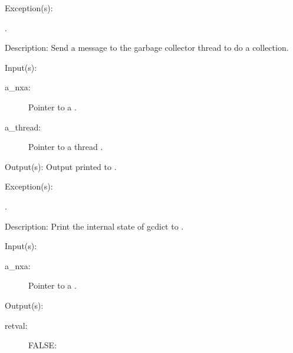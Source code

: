 \begin{capi}
\begin{capilist}
	\item[Exception(s): ]
		\begin{description}\item[]
		\item[.]
		\end{description}
	\item[Description: ]
		Send a message to the garbage collector thread to do a
		collection.
	\end{capilist}
\label{nxa_dump}
	\begin{capilist}
	\item[Input(s): ]
		\begin{description}\item[]
		\item[a\_nxa: ]
			Pointer to a .
		\item[a\_thread: ]
			Pointer to a thread .
		\end{description}
	\item[Output(s): ]
		Output printed to .
	\item[Exception(s): ]
		\begin{description}\item[]
		\item[.]
		\end{description}
	\item[Description: ]
		Print the internal state of gcdict to .
	\end{capilist}
\label{nxa_active_get}
	\begin{capilist}
	\item[Input(s): ]
		\begin{description}\item[]
		\item[a\_nxa: ]
			Pointer to a \classname{nxa}.
		\end{description}
	\item[Output(s): ]
		\begin{description}\item[]
		\item[retval: ]
			\begin{description}\item[]
			\item[FALSE: ]

\end{description}
\end{description}
\end{capilist}
\end{capi}
